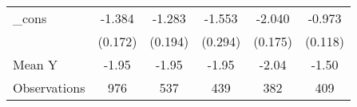 {\begin{tabular}{l*{5}{c}}
\addlinespace
\_cons      &      -1.384\sym{***}&      -1.283\sym{***}&      -1.553\sym{***}&      -2.040\sym{***}&      -0.973\sym{***}\\
            &     (0.172)         &     (0.194)         &     (0.294)         &     (0.175)         &     (0.118)         \\
\midrule
Mean Y      &       -1.95         &       -1.95         &       -1.95         &       -2.04         &       -1.50         \\
Observations&         976         &         537         &         439         &         382         &         409         \\
\bottomrule
\end{tabular}
}
